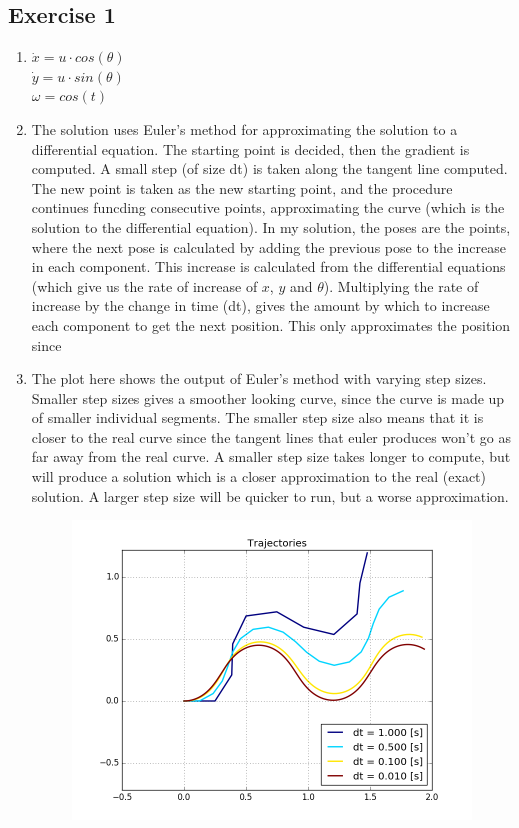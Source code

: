 \documentclass[12pt,a4paper]{article}
\begin{document}
\subsection*{Exercise 1}
\begin{enumerate}[label=(\alph*)]
	\item $\dot{x} = u\cdot cos(\theta)$\\
	      $\dot{y} = u\cdot sin(\theta)$\\
	      $\omega = cos(t)$
        \item The solution uses Euler's method for approximating the solution to a differential equation. The starting point is decided, then the gradient is computed. A small step (of size dt) is taken along the tangent line computed. The new point is taken as the new starting point, and the procedure continues funcding consecutive points, approximating the curve (which is the solution to the differential equation). In my solution, the poses are the points, where the next pose is calculated by adding the previous pose to the increase in each component. This increase is calculated from the differential equations (which give us the rate of increase of $x$, $y$ and $\theta$). Multiplying the rate of increase by the change in time (dt), gives the amount by which to increase each component to get the next position. This only approximates the position since 
	\item The plot here shows the output of Euler's method with varying step sizes. Smaller step sizes gives a smoother looking curve, since the curve is made up of smaller individual segments. The smaller step size also means that it is closer to the real curve since the tangent lines that euler produces won't go as far away from the real curve.  A smaller step size takes longer to compute, but will produce a solution which is a closer approximation to the real (exact) solution. A larger step size will be quicker to run, but a worse approximation.
	      \begin{figure}[h]
	      	\centering
	      	\includegraphics[width=\textwidth]{fig/1c.png}

\end{figure}
\end{enumerate}
\end{document}
